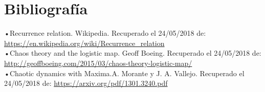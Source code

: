 \documentclass[a4paper]{article}
\begin{document}
\section{Bibliografía}

•Recurrence relation. Wikipedia. Recuperado el 24/05/2018 de: \url{https://en.wikipedia.org/wiki/Recurrence_relation} \\
•Chaos theory and the logistic map. Geoff Boeing. Recuperado el 24/05/2018 de: \url{http://geoffboeing.com/2015/03/chaos-theory-logistic-map/}\\
•Chaotic dynamics with Maxima.A. Morante y J. A. Vallejo. Recuperado el 24/05/2018 de: \url{https://arxiv.org/pdf/1301.3240.pdf}
\end{document}

